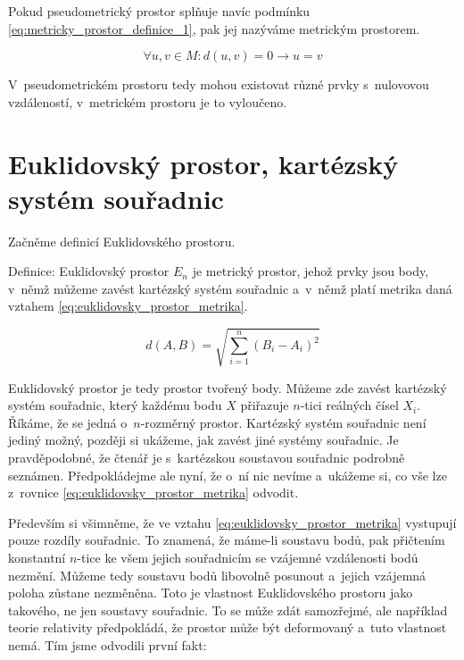 \documentclass{book}
\begin{document}
Pokud pseudometrický prostor splňuje navíc podmínku \eqref{eq:metricky_prostor_definice_1}, pak jej nazýváme metrickým prostorem.

\begin{equation}
\label{eq:metricky_prostor_definice_1}
\forall u, v \in M : d(u, v) = 0 \rightarrow u = v
\end{equation}

V~pseudometrickém prostoru tedy mohou existovat různé prvky s~nulovovou vzdáleností, v~metrickém prostoru je to vyloučeno.

\section{Euklidovský prostor, kartézský systém souřadnic}

Začněme definicí Euklidovského prostoru.

\begin{fact}
Definice: Euklidovský prostor \(E_n\) je metrický prostor, jehož prvky jsou body, v~němž můžeme zavést kartézský systém souřadnic a~v~němž platí metrika daná vztahem \eqref{eq:euklidovsky_prostor_metrika}.

\begin{equation}
\label{eq:euklidovsky_prostor_metrika}
d(A, B) = \sqrt{\sum_{i=1}^{n} (B_i - A_i)^2}
\end{equation}
\end{fact}

Euklidovský prostor je tedy prostor tvořený body. Můžeme zde zavést kartézský systém souřadnic, který každému bodu \(X\) přiřazuje \(n\)-tici reálných čísel \(X_i\). Říkáme, že se jedná o~\(n\)-rozměrný prostor.
Kartézský systém souřadnic není jediný možný, později si ukážeme, jak zavést jiné systémy souřadnic. Je pravděpodobné, že čtenář je s~kartézskou soustavou souřadnic podrobně seznámen. Předpokládejme ale nyní,
že o~ní nic nevíme a~ukážeme si, co vše lze z~rovnice \eqref{eq:euklidovsky_prostor_metrika} odvodit.

Především si všimněme, že ve vztahu \eqref{eq:euklidovsky_prostor_metrika} vystupují pouze rozdíly souřadnic. To znamená, že máme-li soustavu bodů,
pak přičtením konstantní \(n\)-tice ke všem jejich souřadnicím se vzájemné vzdálenosti bodů nezmění. Můžeme tedy soustavu bodů libovolně posunout a~jejich vzájemná poloha zůstane nezměněna. Toto je vlastnost Euklidovského
prostoru jako takového, ne jen soustavy souřadnic. To se může zdát samozřejmé, ale například teorie relativity předpokládá, že prostor může být deformovaný a~tuto vlastnost nemá. Tím jsme odvodili první fakt:
\end{document}
